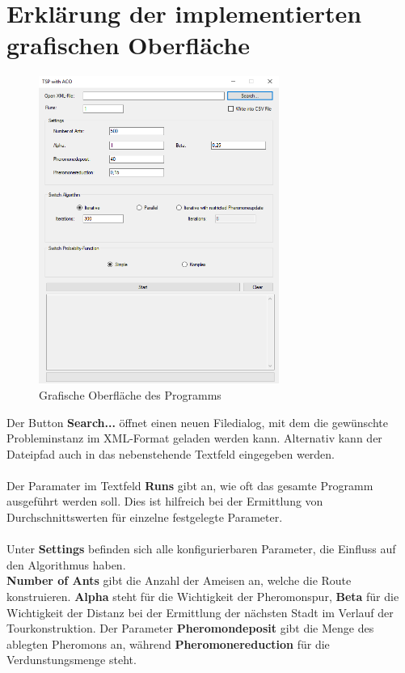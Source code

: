 \documentclass[doktyp=barbeit, sprache=german]{TUBAFarbeiten}
\begin{document}
\section{Erklärung der implementierten grafischen Oberfläche}
\begin{figure}
\captionsetup{justification=centering}
  \centering
     \includegraphics[width=0.7\textwidth]{images/TSPACOGUI.png}
  \caption[Grafische Oberfläche der Implementierung des Ameisenalgorithmus in C\texttt{++}]{Grafische Oberfläche des Programms}
  \label{img:gui}
\end{figure}
Der Button \textbf{Search...} öffnet einen neuen Filedialog, mit dem die gewünschte Probleminstanz im XML-Format geladen werden kann. Alternativ kann der Dateipfad auch in das nebenstehende Textfeld eingegeben werden.
\\\\Der Paramater im Textfeld \textbf{Runs} gibt an, wie oft das gesamte Programm ausgeführt werden soll. Dies ist hilfreich bei der Ermittlung von Durchschnittswerten für einzelne festgelegte Parameter.
\\\\Unter \textbf{Settings} befinden sich alle konfigurierbaren Parameter, die Einfluss auf den Algorithmus haben. 
\\\textbf{Number of Ants} gibt die Anzahl der Ameisen an, welche die Route konstruieren. \textbf{Alpha} steht für die Wichtigkeit der Pheromonspur, \textbf{Beta} für die Wichtigkeit der Distanz bei der Ermittlung der nächsten Stadt im Verlauf der Tourkonstruktion. Der Parameter \textbf{Pheromondeposit} gibt die Menge des ablegten Pheromons an, während \textbf{Pheromonereduction} für die Verdunstungsmenge steht.
\end{document}

